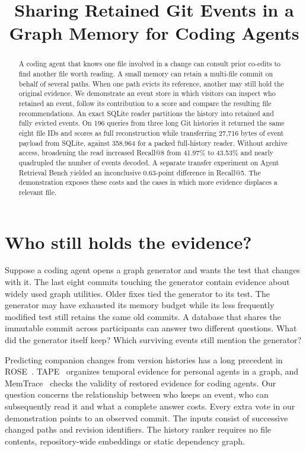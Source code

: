 \documentclass[conference]{IEEEtran}
\title{Sharing Retained Git Events in a Graph Memory for Coding Agents}
\author{\IEEEauthorblockN{Anonymous working draft}}
\begin{document}
\maketitle
\begin{abstract}
A coding agent that knows one file involved in a change can consult prior co-edits to find another file worth reading. A small memory can retain a multi-file commit on behalf of several paths. When one path evicts its reference, another may still hold the original evidence. We demonstrate an event store in which visitors can inspect who retained an event, follow its contribution to a score and compare the resulting file recommendations. An exact SQLite reader partitions the history into retained and fully evicted events. On 196 queries from three long Git histories it returned the same eight file IDs and scores as full reconstruction while transferring 27,716 bytes of event payload from SQLite, against 358,964 for a packed full-history reader. Without archive access, broadening the read increased Recall@8 from 41.97\% to 43.53\% and nearly quadrupled the number of events decoded. A separate transfer experiment on Agent Retrieval Bench yielded an inconclusive 0.63-point difference in Recall@5. The demonstration exposes these costs and the cases in which more evidence displaces a relevant file.
\end{abstract}

\section{Who still holds the evidence?}
Suppose a coding agent opens a graph generator and wants the test that changes with it. The last eight commits touching the generator contain evidence about widely used graph utilities. Older fixes tied the generator to its test. The generator may have exhausted its memory budget while its less frequently modified test still retains the same old commits. A database that shares the immutable commit across participants can answer two different questions. What did the generator itself keep? Which surviving events still mention the generator?

Predicting companion changes from version histories has a long precedent in ROSE~\cite{zimmermann}. TAPE~\cite{tape} organizes temporal evidence for personal agents in a graph, and MemTrace~\cite{memtrace} checks the validity of restored evidence for coding agents. Our question concerns the relationship between who keeps an event, who can subsequently read it and what a complete answer costs. Every extra vote in our demonstration points to an observed commit. The inputs consist of successive changed paths and revision identifiers. The history ranker requires no file contents, repository-wide embeddings or static dependency graph.
\end{document}
